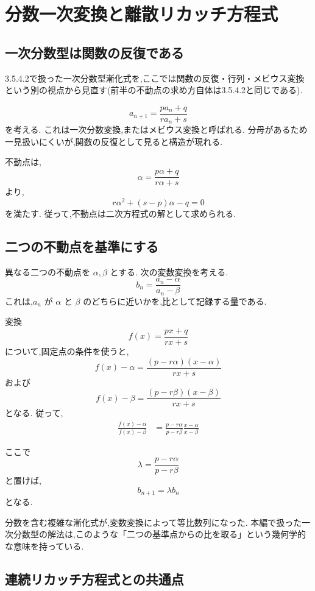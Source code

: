 
\section{分数一次変換と離散リカッチ方程式}

\subsection{一次分数型は関数の反復である}

3.5.4.2で扱った一次分数型漸化式を,ここでは関数の反復・行列・メビウス変換という別の視点から見直す(前半の不動点の求め方自体は3.5.4.2と同じである).

\[
  a_{n+1}=\frac{pa_n+q}{ra_n+s}
\]
を考える.
これは一次分数変換,またはメビウス変換と呼ばれる.
分母があるため一見扱いにくいが,関数の反復として見ると構造が現れる.

不動点は,
\[
  \alpha=\frac{p\alpha+q}{r\alpha+s}
\]
より,
\[
  r\alpha^2+(s-p)\alpha-q=0
\]
を満たす.
従って,不動点は二次方程式の解として求められる.

\subsection{二つの不動点を基準にする}

異なる二つの不動点を $\alpha,\beta$ とする.
次の変数変換を考える.
\[
  b_n=\frac{a_n-\alpha}{a_n-\beta}
\]
これは,$a_n$ が $\alpha$ と $\beta$ のどちらに近いかを,比として記録する量である.

変換
\[
  f(x)=\frac{px+q}{rx+s}
\]
について,固定点の条件を使うと,
\[
  f(x)-\alpha
  =
  \frac{(p-r\alpha)(x-\alpha)}{rx+s}
\]
および
\[
  f(x)-\beta
  =
  \frac{(p-r\beta)(x-\beta)}{rx+s}
\]
となる.
従って,
\[
  \begin{aligned}
    \frac{f(x)-\alpha}{f(x)-\beta}
     & =
    \frac{p-r\alpha}{p-r\beta}
    \frac{x-\alpha}{x-\beta}
  \end{aligned}
\]

ここで
\[
  \lambda=\frac{p-r\alpha}{p-r\beta}
\]
と置けば,
\[
  b_{n+1}=\lambda b_n
\]
となる.

分数を含む複雑な漸化式が,変数変換によって等比数列になった.
本編で扱った一次分数型の解法は,このような「二つの基準点からの比を取る」という幾何学的な意味を持っている.

\subsection{連続リカッチ方程式との共通点}

